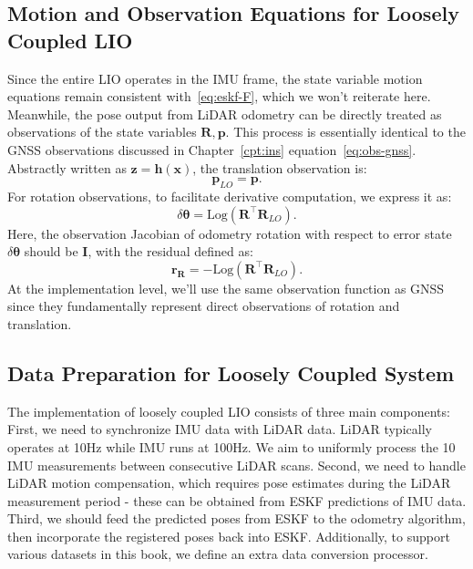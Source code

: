 \subsection{Motion and Observation Equations for Loosely Coupled LIO}
Since the entire LIO operates in the IMU frame, the state variable motion equations remain consistent with~\eqref{eq:eskf-F}, which we won't reiterate here. Meanwhile, the pose output from LiDAR odometry can be directly treated as observations of the state variables $\bm{R}, \bm{p}$. This process is essentially identical to the GNSS observations discussed in Chapter~\ref{cpt:ins} equation~\eqref{eq:obs-gnss}. Abstractly written as $\bm{z}=\bm{h}(\bm{x})$, the translation observation is:
\begin{equation}\label{key}
	\bm{p}_{LO} = \bm{p}.
\end{equation}
For rotation observations, to facilitate derivative computation, we express it as:
\begin{equation}\label{key}
	\delta \boldsymbol{\theta} = \mathrm{Log}(\bm{R}^\top \bm{R}_{LO}).
\end{equation}
Here, the observation Jacobian of odometry rotation with respect to error state $\delta \boldsymbol{\theta}$ should be $\bm{I}$, with the residual defined as:
\begin{equation}\label{key}
	\bm{r}_{\bm{R}} = - \mathrm{Log}( \bm{R}^\top \bm{R}_{LO}).
\end{equation}
At the implementation level, we'll use the same observation function as GNSS since they fundamentally represent direct observations of rotation and translation.

\subsection{Data Preparation for Loosely Coupled System}
The implementation of loosely coupled LIO consists of three main components: First, we need to synchronize IMU data with LiDAR data. LiDAR typically operates at 10Hz while IMU runs at 100Hz. We aim to uniformly process the 10 IMU measurements between consecutive LiDAR scans. Second, we need to handle LiDAR motion compensation, which requires pose estimates during the LiDAR measurement period - these can be obtained from ESKF predictions of IMU data. Third, we should feed the predicted poses from ESKF to the odometry algorithm, then incorporate the registered poses back into ESKF. Additionally, to support various datasets in this book, we define an extra data conversion processor.

